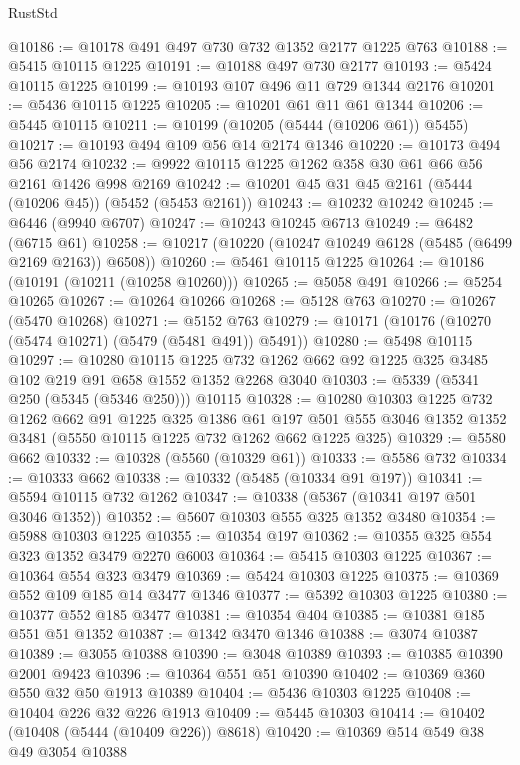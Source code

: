 \begin{lexlean}{RustStd}
\begin{coremodule}
@10186 := @10178 @491 @497 @730 @732 @1352 @2177 @1225 @763
@10188 := @5415 @10115 @1225
@10191 := @10188 @497 @730 @2177
@10193 := @5424 @10115 @1225
@10199 := @10193 @107 @496 @11 @729 @1344 @2176
@10201 := @5436 @10115 @1225
@10205 := @10201 @61 @11 @61 @1344
@10206 := @5445 @10115
@10211 := @10199 (@10205 (@5444 (@10206 @61)) @5455)
@10217 := @10193 @494 @109 @56 @14 @2174 @1346
@10220 := @10173 @494 @56 @2174
@10232 := @9922 @10115 @1225 @1262 @358 @30 @61 @66 @56 @2161 @1426 @998 @2169
@10242 := @10201 @45 @31 @45 @2161 (@5444 (@10206 @45)) (@5452 (@5453 @2161))
@10243 := @10232 @10242
@10245 := @6446 (@9940 @6707)
@10247 := @10243 @10245 @6713
@10249 := @6482 (@6715 @61)
@10258 := @10217 (@10220 (@10247 @10249 @6128 (@5485 (@6499 @2169 @2163)) @6508))
@10260 := @5461 @10115 @1225
@10264 := @10186 (@10191 (@10211 (@10258 @10260)))
@10265 := @5058 @491
@10266 := @5254 @10265
@10267 := @10264 @10266
@10268 := @5128 @763
@10270 := @10267 (@5470 @10268)
@10271 := @5152 @763
@10279 := @10171 (@10176 (@10270 (@5474 @10271) (@5479 (@5481 @491)) @5491))
@10280 := @5498 @10115
@10297 := @10280
    @10115
    @1225
    @732
    @1262
    @662
    @92
    @1225
    @325
    @3485
    @102
    @219
    @91
    @658
    @1552
    @1352
    @2268
    @3040
@10303 := @5339 (@5341 @250 (@5345 (@5346 @250))) @10115
@10328 := @10280
    @10303
    @1225
    @732
    @1262
    @662
    @91
    @1225
    @325
    @1386
    @61
    @197
    @501
    @555
    @3046
    @1352
    @1352
    @3481
    (@5550 @10115 @1225 @732 @1262 @662 @1225 @325)
@10329 := @5580 @662
@10332 := @10328 (@5560 (@10329 @61))
@10333 := @5586 @732
@10334 := @10333 @662
@10338 := @10332 (@5485 (@10334 @91 @197))
@10341 := @5594 @10115 @732 @1262
@10347 := @10338 (@5367 (@10341 @197 @501 @3046 @1352))
@10352 := @5607 @10303 @555 @325 @1352 @3480
@10354 := @5988 @10303 @1225
@10355 := @10354 @197
@10362 := @10355 @325 @554 @323 @1352 @3479 @2270 @6003
@10364 := @5415 @10303 @1225
@10367 := @10364 @554 @323 @3479
@10369 := @5424 @10303 @1225
@10375 := @10369 @552 @109 @185 @14 @3477 @1346
@10377 := @5392 @10303 @1225
@10380 := @10377 @552 @185 @3477
@10381 := @10354 @404
@10385 := @10381 @185 @551 @51 @1352
@10387 := @1342 @3470 @1346
@10388 := @3074 @10387
@10389 := @3055 @10388
@10390 := @3048 @10389
@10393 := @10385 @10390 @2001 @9423
@10396 := @10364 @551 @51 @10390
@10402 := @10369 @360 @550 @32 @50 @1913 @10389
@10404 := @5436 @10303 @1225
@10408 := @10404 @226 @32 @226 @1913
@10409 := @5445 @10303
@10414 := @10402 (@10408 (@5444 (@10409 @226)) @8618)
@10420 := @10369 @514 @549 @38 @49 @3054 @10388

\end{coremodule}
\end{lexlean}
